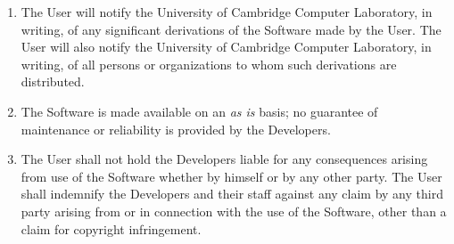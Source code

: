 \begin{titlepage}
\begin{enumerate}
\item The User will notify the University of Cambridge Computer
Laboratory, in writing, of any significant derivations of
the Software made by
the User. The User will also notify the University of Cambridge Computer
Laboratory, in writing, of all persons or organizations to whom such
derivations are distributed.

\item The Software is made available on an {\it as is\/} basis; no guarantee
of maintenance or reliability is provided by the Developers.

\item The User shall not hold the Developers
liable for any consequences arising from use of the
Software whether by himself or by any other party.
The User shall indemnify the Developers and their staff against any claim by
any third party arising from or in connection with the use of the Software,
other than a claim for copyright infringement.
\end{enumerate}


\bigskip

\dotfill\mbox{}

\bigskip

\dotfill\mbox{}

\bigskip

\dotfill\mbox{}

\end{titlepage}




